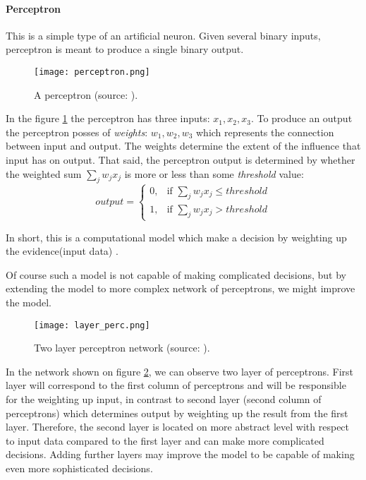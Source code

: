 \paragraph{Perceptron} This is a simple type of an artificial neuron.
Given several binary inputs, perceptron is meant to produce a single binary output.
\begin{figure}[H]
	\texttt{[image: perceptron.png]}
	\caption{A perceptron (source: \cite{Nielsen2015}).} %
	\label{img:model} %
\end{figure}
In the figure \ref{img:model} the perceptron has three inputs: $x_1, x_2, x_3$.
To produce an output the perceptron posses of \emph{weights}: $w_1, w_2, w_3$ which represents
the connection between input and output. The weights determine the
extent of the influence that input has on output.
That said, the perceptron output is determined by whether the weighted sum $\sum_j w_j x_j$ is more or less
than some \emph{threshold} value:
\begin{equation} \label{perc:out}
	output = \begin{cases} 0, & \mbox{if } \sum_j w_j x_j \leq threshold \\ 1, & \mbox{if } \sum_j w_j x_j > threshold \end{cases}
\end{equation}

In short, this is a computational model which make a decision by weighting up
the evidence(input data) \cite{rosenblatt1962principles}.

Of course such a model is not capable of making complicated decisions, but
by extending the model to more complex network of perceptrons, we might improve the model.

\begin{figure}[H]
	\texttt{[image: layer\_perc.png]}
	\caption{Two layer perceptron network (source: \cite{Nielsen2015}).} %
	\label{img:layer_perc} %
\end{figure}

In the network shown on figure \ref{img:layer_perc}, we can observe
two layer of perceptrons. First layer will correspond to the first column of perceptrons
and will be responsible for the weighting up input, in contrast to second layer
(second column of perceptrons) which determines output by weighting up the result from
the first layer. Therefore, the second layer is located on more abstract level
with respect to input data
compared to the first layer and can make more complicated decisions. Adding further
layers may improve the model to be capable
of making even more sophisticated decisions.
